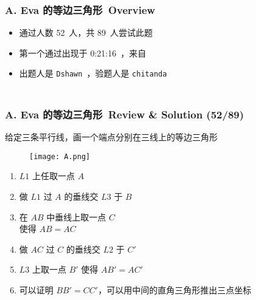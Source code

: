 \documentclass[notheorems]{beamer}
\newcommand{\zhProbA}{Eva 的等边三角形}	\newcommand{\DiffA}{Easy}		\newcommand{\AuthProbA}{\texttt{Dshawn}}		\newcommand{\TestProbA}{\texttt{chitanda}}
\newcommand{\AccInProbA}{52}	\newcommand{\SubInProbA}{89}	\newcommand{\RatInProbA}{58.43\%}
\newcommand{\FirPenInProbA}{0:21:16}		\newcommand{\FirPerInProbA}{\Someone}
\begin{document}
\begin{frame}[label = ProbA]
\frametitle{\\ A. \zhProbA\ Overview}
\begin{spacing}{2.0} \large
\begin{itemize}
\item 通过人数 \AccInProbA\ 人，共 \SubInProbA\ 人尝试此题
\item 第一个通过出现于 \FirPenInProbA\ ，来自 \FirPerInProbA\ 
\item 出题人是 \AuthProbA\ ，验题人是 \TestProbA\
\end{itemize}
\end{spacing}
\end{frame}
\begin{frame}
\frametitle{\\ A. \zhProbA\ Review \& Solution (\AccInProbA/\SubInProbA)}
\begin{spacing}{1.5} \large
\noindent 给定三条平行线，画一个端点分别在三线上的等边三角形 \pause
\begin{wrapfigure}{r}{3.8cm}
\vspace{0.8cm}
\texttt{[image: A.png]}
\end{wrapfigure}
\vspace{-0.8cm}
\begin{enumerate}[1.]
\item $L1$ 上任取一点 $A$
\item 做 $L1$ 过 $A$ 的垂线交 $L3$ 于 $B$
\item 在 $AB$ 中垂线上取一点 $C$ \\ 使得 $AB = AC$
\item 做 $AC$ 过 $C$ 的垂线交 $L2$ 于 $C'$
\item $L3$ 上取一点 $B'$ 使得 $AB' = AC'$
\item 可以证明 $BB' = CC'$，可以用中间的直角三角形推出三点坐标
\end{enumerate}
\end{spacing}
\end{frame}
\end{document}
